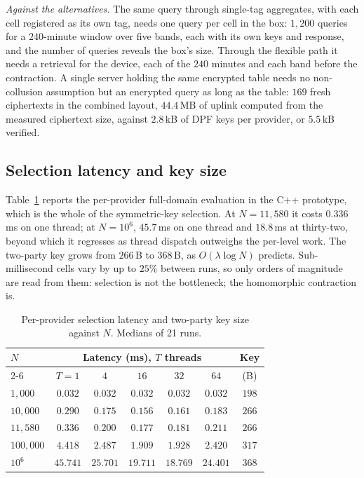 \documentclass[a4paper,fleqn]{cas-sc}
\begin{document}
\emph{Against the alternatives.} The same query through single-tag aggregates,
with each cell registered as its own tag, needs one query per cell in the box:
$1{,}200$ queries for a $240$-minute window over five bands, each with its own
keys and response, and the number of queries reveals the box's size. Through
the flexible path it needs a retrieval for the device, each of the $240$
minutes and each band before the contraction. A single server holding the same
encrypted table needs no non-collusion assumption but an encrypted query as long
as the table: $169$ fresh ciphertexts in the combined layout, $44.4$\,MB of
uplink computed from the measured ciphertext size, against $2.8$\,kB of DPF
keys per provider, or $5.5$\,kB verified.

\subsection{Selection latency and key size}
Table~\ref{tab:search} reports the per-provider full-domain evaluation in the
C++ prototype, which is the whole of the symmetric-key selection. At
$N=11{,}580$ it costs $0.336$\,ms on one thread; at $N=10^6$, $45.7$\,ms on one
thread and $18.8$\,ms at thirty-two, beyond which it regresses as thread
dispatch outweighs the per-level work. The two-party key grows from $266$\,B to
$368$\,B, as $O(\lambda\log N)$ predicts. Sub-millisecond cells vary by up to
$25\%$ between runs, so only orders of magnitude are read from them: selection
is not the bottleneck; the homomorphic contraction is.

\begin{table}[pos=htbp]
\caption{Per-provider selection latency and two-party key size against $N$.
Medians of 21 runs.}
\label{tab:search}
\centering
\footnotesize
\setlength{\tabcolsep}{2pt}
\renewcommand{\arraystretch}{1.2}
\begin{tabular*}{\tblwidth}{@{\extracolsep{\fill}}lcccccc@{}}
\toprule
$N$ & \multicolumn{5}{c}{Latency (ms), $T$ threads} & Key \\
\cmidrule(lr){2-6}
    & $T=1$ & $4$ & $16$ & $32$ & $64$ & (B) \\
\midrule
$1{,}000$    & $0.032$  & $0.032$  & $0.032$  & $0.032$  & $0.032$  & $198$ \\
$10{,}000$   & $0.290$  & $0.175$  & $0.156$  & $0.161$  & $0.183$  & $266$ \\
$11{,}580$   & $0.336$  & $0.200$  & $0.177$  & $0.181$  & $0.211$  & $266$ \\
$100{,}000$  & $4.418$  & $2.487$  & $1.909$  & $1.928$  & $2.420$  & $317$ \\
$10^{6}$     & $45.741$ & $25.701$ & $19.711$ & $18.769$ & $24.401$ & $368$ \\
\bottomrule
\end{tabular*}
\end{table}
\end{document}
